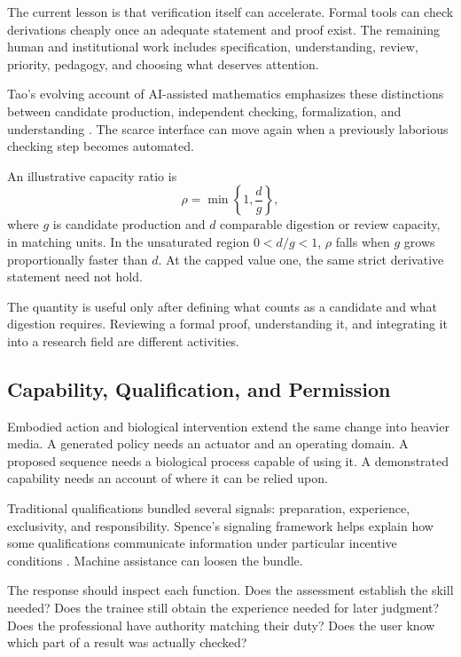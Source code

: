 \documentclass[11pt,openany]{book}
\begin{document}
The current lesson is that verification itself can accelerate. Formal tools can check derivations cheaply once an adequate statement and proof exist. The remaining human and institutional work includes specification, understanding, review, priority, pedagogy, and choosing what deserves attention.

Tao's evolving account of AI-assisted mathematics emphasizes these distinctions between candidate production, independent checking, formalization, and understanding \cite{tao2026aiviews}. The scarce interface can move again when a previously laborious checking step becomes automated.

An illustrative capacity ratio is
\begin{equation}
 \rho=\min\left\{1,\frac{d}{g}\right\},
\end{equation}
where $g$ is candidate production and $d$ comparable digestion or review capacity, in matching units. In the unsaturated region $0<d/g<1$, $\rho$ falls when $g$ grows proportionally faster than $d$. At the capped value one, the same strict derivative statement need not hold.

The quantity is useful only after defining what counts as a candidate and what digestion requires. Reviewing a formal proof, understanding it, and integrating it into a research field are different activities.

\subsection{Capability, Qualification, and Permission}

Embodied action and biological intervention extend the same change into heavier media. A generated policy needs an actuator and an operating domain. A proposed sequence needs a biological process capable of using it. A demonstrated capability needs an account of where it can be relied upon.

Traditional qualifications bundled several signals: preparation, experience, exclusivity, and responsibility. Spence's signaling framework helps explain how some qualifications communicate information under particular incentive conditions \cite{spence1973job}. Machine assistance can loosen the bundle.

The response should inspect each function. Does the assessment establish the skill needed? Does the trainee still obtain the experience needed for later judgment? Does the professional have authority matching their duty? Does the user know which part of a result was actually checked?
\end{document}
